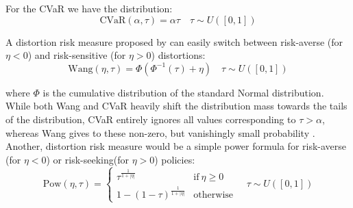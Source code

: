For the CVaR we have the distribution:
\begin{equation}
    \text{CVaR}(\alpha, \tau)=\alpha\tau \quad \tau \sim U([0,1])
\end{equation}

A distortion risk measure proposed by \citet{Wang2000} can easily switch between
risk-averse (for $\eta<0$) and risk-sensitive (for $\eta>0$) distortions:
\begin{equation}
    \text{Wang}(\eta, \tau) = \Phi (\Phi ^{-1}(\tau) + \eta) \quad \tau \sim U([0,1])
\end{equation}

where $\Phi$ is the cumulative distribution of the standard Normal distribution.\\
While both Wang and CVaR heavily shift the distribution mass towards the
tails of the distribution,  CVaR entirely ignores all values corresponding to $\tau>\alpha$,
whereas Wang gives to these non-zero, but vanishingly small probability \citep{Dabney2018b}.\\
Another, distortion risk measure would be a simple power formula
for risk-averse (for $\eta<0$) or risk-seeking(for $\eta>0$) policies:
\begin{equation}
    \text{Pow}(\eta,\tau)  = \left\{
	    \begin{array}{ll}
		 \tau ^ {\frac{1}{1+|\eta|}}      & \mathrm{if\ } \eta \ge 0 \\
		 1-(1-\tau)^{\frac{1}{1+|\eta|}}      & \mathrm{otherwise }
        \end{array}
        \right.
    \quad \tau \sim U([0,1])
\end{equation}
